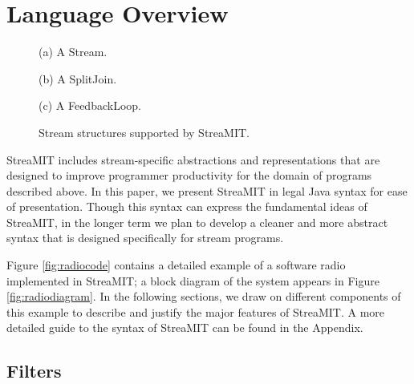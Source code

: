 \section{Language Overview}
\label{sec:overview}

\begin{figure}
\centering
{}

(a) A Stream. \\
\vspace{8pt}

(b) A SplitJoin. \\
\vspace{8pt}

(c) A FeedbackLoop. \\
\vspace{8pt}
\caption{Stream structures supported by StreaMIT.}
\label{fig:structuresp}
\end{figure}

StreaMIT includes stream-specific abstractions and representations
that are designed to improve programmer productivity for the domain of
programs described above.  In this paper, we present StreaMIT in legal
Java syntax for ease of presentation.  Though this syntax can express
the fundamental ideas of StreaMIT, in the longer term we plan to
develop a cleaner and more abstract syntax that is designed
specifically for stream programs.

\begin{figure*}
\centering
{}
\caption{A block diagram of a software radio.  A detailed StreaMIT
implementation appears in Figure \ref{fig:radiocode}.}
\label{fig:radiodiagram}
\end{figure*}

Figure \ref{fig:radiocode} contains a detailed example of a software
radio implemented in StreaMIT; a block diagram of the system appears
in Figure \ref{fig:radiodiagram}.  In the following sections, we draw
on different components of this example to describe and justify the
major features of StreaMIT.  A more detailed guide to the syntax of
StreaMIT can be found in the Appendix.

\subsection{Filters}

